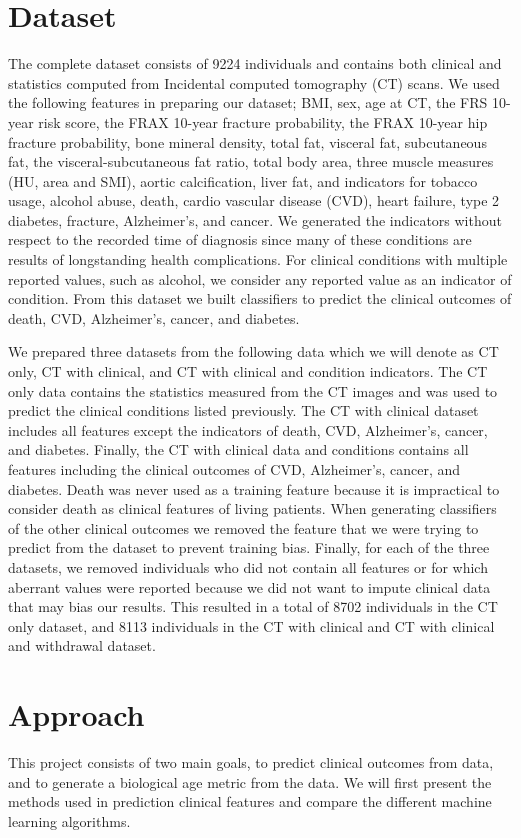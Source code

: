 \documentclass{article}
\begin{document}
\section{Dataset}
The complete dataset consists of 9224 individuals and contains both clinical and statistics computed from Incidental computed tomography (CT) scans. We used the following features in preparing our dataset; BMI, sex, age at CT, the FRS 10-year risk score, the FRAX 10-year fracture probability, the FRAX 10-year hip fracture probability, bone mineral density, total fat, visceral fat, subcutaneous fat, the visceral-subcutaneous fat ratio, total body area, three muscle measures (HU, area and SMI), aortic calcification, liver fat, and indicators for tobacco usage, alcohol abuse, death, cardio vascular disease (CVD), heart failure, type 2 diabetes, fracture, Alzheimer's, and cancer. We generated the indicators without respect to the recorded  time of diagnosis since many of these conditions are results of longstanding health complications. For clinical conditions with multiple reported values, such as alcohol, we consider any reported value as an indicator of condition. From this dataset we built classifiers to predict the clinical outcomes of death, CVD, Alzheimer's, cancer, and diabetes. 

We prepared three datasets from the following data which we will denote as CT only, CT with clinical, and CT with clinical and condition indicators. The CT only data contains the statistics measured from the CT images and was used to predict the clinical conditions listed previously. The CT with clinical dataset includes all features except the indicators of death, CVD, Alzheimer's, cancer, and diabetes. Finally, the CT with clinical data and conditions contains all features including the clinical outcomes of CVD, Alzheimer's, cancer, and diabetes. Death was never used as a training feature because it is impractical to consider death as clinical features of living patients. When generating classifiers of the other clinical outcomes we removed the feature that we were trying to predict from the dataset to prevent training bias. Finally, for each of the three datasets, we removed individuals who did not contain all features or for which aberrant  values were reported because we did not want to impute clinical data that may bias our results. This resulted in a total of 8702 individuals in the CT only dataset, and 8113 individuals in the CT with clinical and CT with clinical and withdrawal dataset. 

\section{Approach}
This project consists of two main goals, to predict clinical outcomes from data, and to generate a biological age metric from the data. We will first present the methods used in prediction clinical features and compare the different machine learning algorithms.
\end{document}

